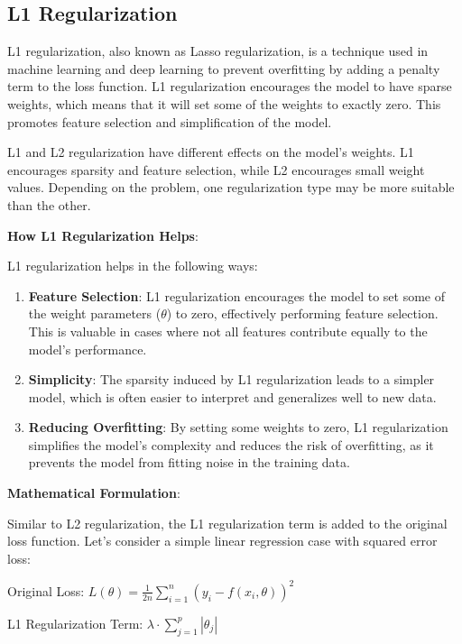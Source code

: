 \documentclass{report}
\begin{document}
\subsection{L1 Regularization}

L1 regularization, also known as Lasso regularization, is a technique used in machine learning and deep learning to prevent overfitting by adding a penalty term to the loss function. L1 regularization encourages the model to have sparse weights, which means that it will set some of the weights to exactly zero. This promotes feature selection and simplification of the model.

L1 and L2 regularization have different effects on the model's weights. L1 encourages sparsity and feature selection, while L2 encourages small weight values. Depending on the problem, one regularization type may be more suitable than the other.

\textbf{How L1 Regularization Helps}:

L1 regularization helps in the following ways:
\begin{enumerate}
\item \textbf{Feature Selection}: L1 regularization encourages the model to set some of the weight parameters (\( \theta \)) to zero, effectively performing feature selection. This is valuable in cases where not all features contribute equally to the model's performance.

\item \textbf{Simplicity}: The sparsity induced by L1 regularization leads to a simpler model, which is often easier to interpret and generalizes well to new data.

\item \textbf{Reducing Overfitting}: By setting some weights to zero, L1 regularization simplifies the model's complexity and reduces the risk of overfitting, as it prevents the model from fitting noise in the training data.
\end{enumerate}

\textbf{Mathematical Formulation}:

Similar to L2 regularization, the L1 regularization term is added to the original loss function. Let's consider a simple linear regression case with squared error loss:

Original Loss: \( L(\theta) = \frac{1}{2n} \sum_{i=1}^{n} (y_i - f(x_i, \theta))^2 \)

L1 Regularization Term: \( \lambda \cdot \sum_{j=1}^{p} |\theta_j| \)
\end{document}

